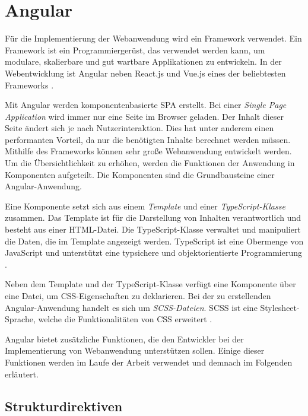 \chapter{Angular}\label{Angular}

Für die Implementierung der Webanwendung wird ein Framework verwendet. Ein Framework ist ein Programmiergerüst, das verwendet werden kann, um modulare, skalierbare und gut wartbare Applikationen zu entwickeln. In der Webentwicklung ist Angular neben React.js und Vue.js eines der beliebtesten Frameworks \cite{stackoverflow2021}.  

Mit Angular werden komponentenbasierte \ac{SPA} erstellt. Bei einer \textit{Single Page Application} wird immer nur eine Seite im Browser geladen. Der Inhalt dieser Seite ändert sich je nach Nutzerinteraktion. Dies hat unter anderem einen performanten Vorteil, da nur die benötigten Inhalte berechnet werden müssen. 
Mithilfe des Frameworks können sehr große Webanwendung entwickelt werden. Um die Übersichtlichkeit zu erhöhen, werden die Funktionen der Anwendung in Komponenten aufgeteilt. Die Komponenten sind die Grundbausteine einer Angular-Anwendung. 

Eine Komponente setzt sich aus einem \textit{Template} und einer \textit{TypeScript-Klasse} zusammen. Das Template ist für die Darstellung von Inhalten verantwortlich und besteht aus einer HTML-Datei. Die TypeScript-Klasse verwaltet und manipuliert die Daten, die im Template angezeigt werden. TypeScript ist eine Obermenge von JavaScript und unterstützt eine typsichere und objektorientierte Programmierung \cite{TypeScript2021}. 

Neben dem Template und der TypeScript-Klasse verfügt eine Komponente über eine Datei, um CSS-Eigenschaften zu deklarieren. Bei der zu erstellenden Angular-Anwendung handelt es sich um \textit{SCSS-Dateien}. SCSS ist eine Stylesheet-Sprache, welche die Funktionalitäten von CSS erweitert \cite{Sass2021}. 

Angular bietet zusätzliche Funktionen, die den Entwickler bei der Implementierung von Webanwendung unterstützen sollen. Einige dieser Funktionen werden im Laufe der Arbeit verwendet und demnach im Folgenden erläutert. 


\section{Strukturdirektiven} \label{sec:Strukturdirektive}

